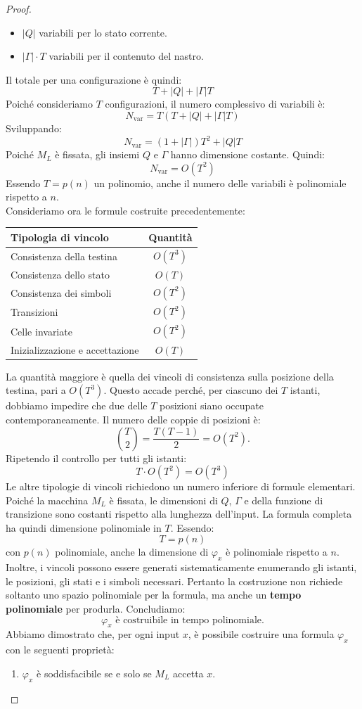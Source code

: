 \begin{proof}
\begin{itemize}
    \item $|Q|$ variabili per lo stato corrente.

    \item $|\Gamma|\cdot T$ variabili
    per il contenuto del nastro.
\end{itemize}
Il totale per una configurazione è quindi:
\[
T+|Q|+|\Gamma|T
\]
Poiché consideriamo $T$ configurazioni,
il numero complessivo di variabili è:
\[
\boxed{
N_{\text{var}}=
T(T+|Q|+|\Gamma|T)
}
\]
Sviluppando:
\[
N_{\text{var}}=
(1+|\Gamma|)T^2+|Q|T
\]
Poiché $M_L$ è fissata, gli insiemi
$Q$ e $\Gamma$ hanno dimensione costante.
Quindi:
\[
\boxed{N_{\text{var}}=O(T^2)}
\]
Essendo $T=p(n)$ un polinomio,
anche il numero delle variabili è
polinomiale rispetto a $n$.\smallskip\\
Consideriamo ora le formule costruite
precedentemente:
\begin{center}
\begin{tabular}{|l|c|}
\hline
\textbf{Tipologia di vincolo}
& \textbf{Quantità} \\
\hline
Consistenza della testina & $O(T^3)$ \\
\hline
Consistenza dello stato & $O(T)$ \\
\hline
Consistenza dei simboli & $O(T^2)$ \\
\hline
Transizioni & $O(T^2)$ \\
\hline
Celle invariate & $O(T^2)$ \\
\hline
Inizializzazione e accettazione & $O(T)$ \\
\hline
\end{tabular}
\end{center}
La quantità maggiore è quella dei vincoli
di consistenza sulla posizione della testina,
pari a $O(T^3)$.
Questo accade perché, per ciascuno dei $T$
istanti, dobbiamo impedire che due delle $T$
posizioni siano occupate contemporaneamente.
Il numero delle coppie di posizioni è:
\[
\binom{T}{2}=\frac{T(T-1)}{2}=O(T^2).
\]
Ripetendo il controllo per tutti gli istanti:
\[
T\cdot O(T^2)=O(T^3)
\]
Le altre tipologie di vincoli richiedono
un numero inferiore di formule elementari.
Poiché la macchina $M_L$ è fissata,
le dimensioni di $Q$, $\Gamma$ e della
funzione di transizione sono costanti
rispetto alla lunghezza dell'input.
La formula completa ha quindi dimensione
polinomiale in $T$.
Essendo:
\[
T=p(n)
\]
con $p(n)$ polinomiale, anche la dimensione
di $\varphi_x$ è polinomiale rispetto a $n$.
Inoltre, i vincoli possono essere generati
sistematicamente enumerando gli istanti,
le posizioni, gli stati e i simboli necessari.
Pertanto la costruzione non richiede soltanto
uno spazio polinomiale per la formula,
ma anche un \textbf{tempo polinomiale}
per produrla.
Concludiamo:
\[
\boxed{
\varphi_x\text{ è costruibile in tempo polinomiale}.
}
\]
Abbiamo dimostrato che, per ogni input $x$,
è possibile costruire una formula $\varphi_x$
con le seguenti proprietà:
\begin{enumerate}
    \item $\varphi_x$ è soddisfacibile
    se e solo se $M_L$ accetta $x$.


\end{enumerate}
\end{proof}
